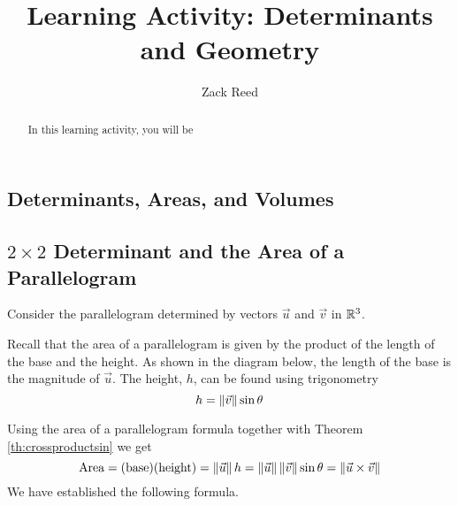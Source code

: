 \documentclass{ximera}
\author{Zack Reed}
\title{Learning Activity: Determinants and Geometry}
\begin{document}
\begin{abstract}

    In this learning activity, you will be 
\end{abstract}
\maketitle

\begin{onlineOnly}
    \section*{Determinants, Areas, and Volumes}
    \end{onlineOnly}
     
    \subsection*{$2\times 2$ Determinant and the Area of a Parallelogram}
     
    Consider the parallelogram determined by vectors $\vec{u}$ and $\vec{v}$ in $\mathbb{R}^3$.
     
    \begin{center}
    \end{center}
     
    Recall that the area of a parallelogram is given by the product of the length of the base and the height.
    As shown in the diagram below, the length of the base is the magnitude of $\vec{u}$. The height, $h$, can be found using trigonometry $$h=\left\|\vec{v}\right\|\sin\theta$$
    \begin{center}
    \end{center}
    Using the area of a parallelogram formula together with Theorem \ref{th:crossproductsin} we get
    $$\mbox{Area}=(\text{base})(\text{height})=\left\|\vec{u}\right\|h=\left\|\vec{u}\right\|\left\|\vec{v}\right\|\sin\theta=\left\|\vec{u}\times\vec{v}\right\|$$
    We have established the following formula.
     
\end{document}
